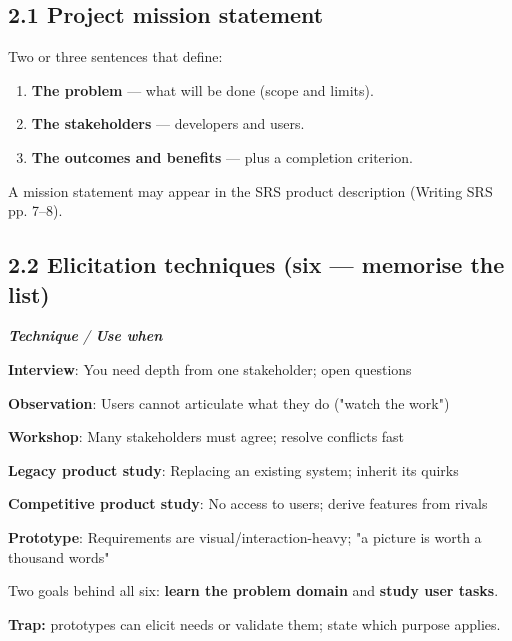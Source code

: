 \begin{studycolumns}
\vspace{0pt}



\subsection*{2.1 Project mission statement}
Two or three sentences that define:

\begin{enumerate}
\item \textbf{The problem} --- what will be done (scope and limits).
\item \textbf{The stakeholders} --- developers and users.
\item \textbf{The outcomes and benefits} --- plus a completion criterion.
\end{enumerate}


A mission statement may appear in the SRS product description (Writing SRS pp. 7--8).

\subsection*{2.2 Elicitation techniques (six --- memorise the list)}

\begin{referenceentries}
\textit{\textbf{Technique} / \textbf{Use when}}\par\smallskip
\noindent \textbf{\textbf{Interview}}: You need depth from one stakeholder; open questions\par
\noindent \textbf{\textbf{Observation}}: Users cannot articulate what they do ("watch the work")\par
\noindent \textbf{\textbf{Workshop}}: Many stakeholders must agree; resolve conflicts fast\par
\noindent \textbf{\textbf{Legacy product study}}: Replacing an existing system; inherit its quirks\par
\noindent \textbf{\textbf{Competitive product study}}: No access to users; derive features from rivals\par
\noindent \textbf{\textbf{Prototype}}: Requirements are visual/\allowbreak{}interaction-heavy; "a picture is worth a thousand words"\par
\end{referenceentries}
Two goals behind all six: \textbf{learn the problem domain} and \textbf{study user tasks}.

\textbf{Trap:} prototypes can elicit needs or validate them; state which purpose applies.
\end{studycolumns}

